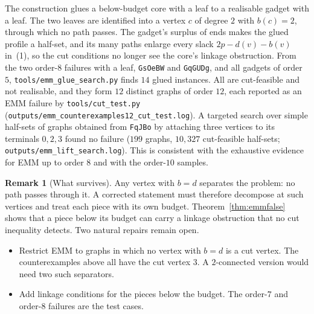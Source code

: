 \documentclass[11pt]{amsart}
\theoremstyle{definition}
\newtheorem{remark}[theorem]{Remark}
\begin{document}
The construction glues a below-budget core with a leaf to a realisable gadget with a leaf. The two
leaves are identified into a vertex $c$ of degree $2$ with $b(c)=2$, through which no path passes.
The gadget's surplus of ends makes the glued profile a half-set, and its many paths enlarge every
slack $2p-d(v)-b(v)$ in~(1), so the cut conditions no longer see the core's linkage obstruction.
From the two order-$8$ failures with a leaf, \texttt{GsOeBW} and \texttt{GqGUDg}, and all gadgets of
order $5$, \texttt{tools/emm\_glue\_search.py} finds $14$ glued instances. All are cut-feasible and
not realisable, and they form $12$ distinct graphs of order $12$, each reported as an EMM failure
by \texttt{tools/cut\_test.py} (\texttt{outputs/emm\_counterexamples12\_cut\_test.log}). A targeted
search over simple half-sets of graphs obtained from \texttt{FqJBo} by attaching three vertices to
its terminals $0,2,3$ found no failure ($199$ graphs, $10{,}327$ cut-feasible half-sets;
\texttt{outputs/emm\_lift\_search.log}). This is consistent with the exhaustive evidence for EMM up
to order $8$ and with the order-$10$ samples.

\begin{remark}[What survives]\label{rem:survives}
Any vertex with $b=d$ separates the problem: no path passes through it. A corrected statement must
therefore decompose at such vertices and treat each piece with its own budget. Theorem~\ref{thm:emmfalse}
shows that a piece below its budget can carry a linkage obstruction that no cut inequality
detects. Two natural repairs remain open.
\begin{itemize}
\item Restrict EMM to graphs in which no vertex with $b=d$ is a cut vertex. The counterexamples
above all have the cut vertex $3$. A $2$-connected version would need two such separators.
\item Add linkage conditions for the pieces below the budget. The order-$7$ and order-$8$ failures
are the test cases.
\end{itemize}
\end{remark}
\end{document}
